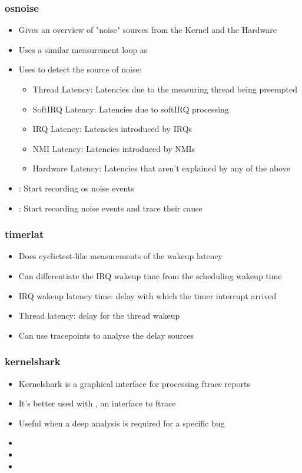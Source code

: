 \begin{frame}
	\frametitle{osnoise}
	\begin{itemize}
		\item Gives an overview of "noise" sources from the Kernel and the Hardware
		\item Uses a similar measurement loop as 
		\item Uses  to detect the source of noise:
			\begin{itemize}
				\item Thread Latency: Latencies due to the measuring thread being preempted
				\item SoftIRQ Latency: Latencies due to softIRQ processing
				\item IRQ Latency: Latencies introduced by IRQs
				\item NMI Latency: Latencies introduced by NMIs
				\item Hardware Latency: Latencies that aren't explained by any of the above
			\end{itemize}
		\item {}: Start recording os noise events
		\item {}: Start recording noise events and trace their cause
	\end{itemize}
\end{frame}

\begin{frame}
	\frametitle{timerlat}
	\begin{itemize}
		\item Does cyclictest-like measurements of the wakeup latency
		\item Can differentiate the IRQ wakeup time from the scheduling wakeup time
		\item IRQ wakeup latency time: delay with which the timer interrupt arrived
		\item Thread latency: delay for the thread wakeup
		\item Can use  tracepoints to analyse the delay sources
	\end{itemize}
\end{frame}

\begin{frame}
	\frametitle{kernelshark}
	\begin{itemize}
		\item Kernelshark is a graphical interface for processing ftrace reports
		\item It's better used with , an interface to ftrace
		\item Useful when a deep analysis is required for a specific bug 
		\item {}
		\item {}
		\item {}
	\end{itemize}
\end{frame}


